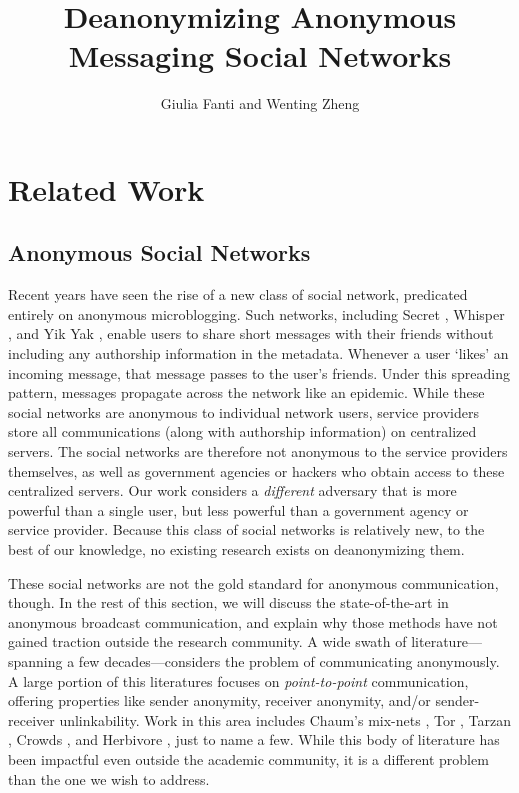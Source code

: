 \documentclass[10pt, twocolumn]{article}
\begin{document}
\title{Deanonymizing Anonymous Messaging Social Networks}

\author{Giulia Fanti and Wenting Zheng}

   \date{}
   \maketitle
   \thispagestyle{empty}
\section{Related Work}

\subsection{Anonymous Social Networks} 
Recent years have seen the rise of a new class of social network, predicated entirely on anonymous microblogging.
Such networks, including Secret \cite{secret}, Whisper \cite{whisper}, and Yik Yak \cite{yikyak}, enable users to share short messages with their friends without including any authorship information in the metadata. 
Whenever a user `likes' an incoming message, that message passes to the user's friends.
Under this spreading pattern, messages propagate across the network like an epidemic.
While these social networks are anonymous to individual network users, service providers store all communications (along with authorship information) on centralized servers.
The social networks are therefore not anonymous to the service providers themselves, as well as government agencies or hackers who obtain access to these centralized servers.
Our work considers a \emph{different} adversary that is more powerful than a single user, but less powerful than a government agency or service provider.
Because this class of social networks is relatively new, to the best of our knowledge, no existing research exists on deanonymizing them.

These social networks are not the gold standard for anonymous communication, though. In the rest of this section, we will discuss the state-of-the-art in anonymous broadcast communication, and explain why those methods have not gained traction outside the research community.
A wide swath of literature---spanning a few decades---considers the problem of communicating anonymously.
A large portion of this literatures focuses on \emph{point-to-point} communication, offering properties like sender anonymity, receiver anonymity, and/or sender-receiver unlinkability. 
Work in this area includes Chaum's mix-nets \cite{chaum1981untraceable}, Tor \cite{tor}, Tarzan \cite{tarzan}, Crowds \cite{reiter1998crowds}, and Herbivore \cite{goel2003herbivore}, just to name a few.
While this body of literature has been impactful even outside the academic community, it is a different problem than the one we wish to address.
\end{document}

